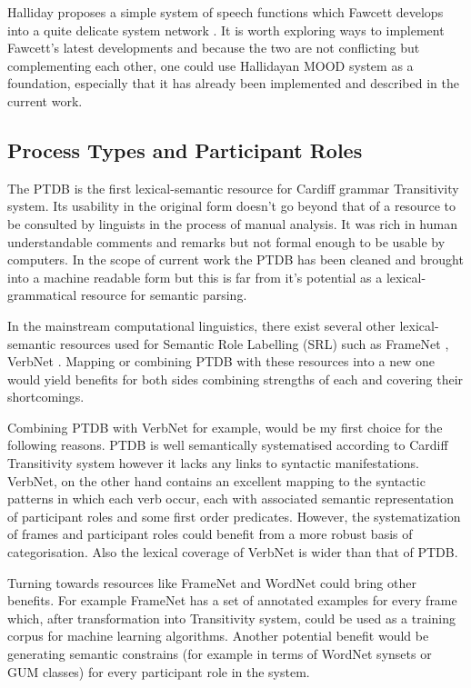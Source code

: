 Halliday proposes a simple system of speech functions \citep[p.136]{Halliday2013} which Fawcett develops into a quite delicate system network \citep{Fawcett2011}. It is worth exploring ways to implement Fawcett's latest developments and because the two are not conflicting but complementing each other, one could use Hallidayan MOOD system as a foundation, especially that it has already been implemented and described in the current work. 

\subsection{Process Types and Participant Roles}
The PTDB \citep{Neale2002} is the first lexical-semantic resource for Cardiff grammar Transitivity system. Its usability in the original form doesn't go beyond that of a resource to be consulted by linguists in the process of manual analysis. It was rich in human understandable comments and remarks but not formal enough to be usable by computers. In the scope of current work the PTDB has been cleaned and brought into a machine readable form but this is far from it's potential as a lexical-grammatical resource for semantic parsing. 

In the mainstream computational linguistics, there exist several other lexical-semantic resources used for Semantic Role Labelling (SRL) such as FrameNet \citep{Baker1998}, VerbNet \citep{Kipper2008}. Mapping or combining PTDB with these resources into a new one would yield benefits for both sides combining strengths of each and covering their shortcomings.

Combining PTDB with VerbNet for example, would be my first choice for the following reasons. PTDB is well semantically systematised according to Cardiff Transitivity system however it lacks any links to syntactic manifestations. VerbNet, on the other hand contains an excellent mapping to the syntactic patterns in which each verb occur, each with associated semantic representation of participant roles and some first order predicates. However, the systematization of frames and participant roles could benefit from a more robust basis of categorisation. Also the lexical coverage of VerbNet is wider than that of PTDB. 

Turning towards resources like FrameNet and WordNet could bring other benefits. For example FrameNet has a set of annotated examples for every frame which, after transformation into Transitivity system, could be used as a training corpus for machine learning algorithms. Another potential benefit would be generating semantic constrains (for example in terms of WordNet \citep{Miller1995} synsets or GUM \citep{Bateman1995,Bateman2010} classes) for every participant role in the system.

